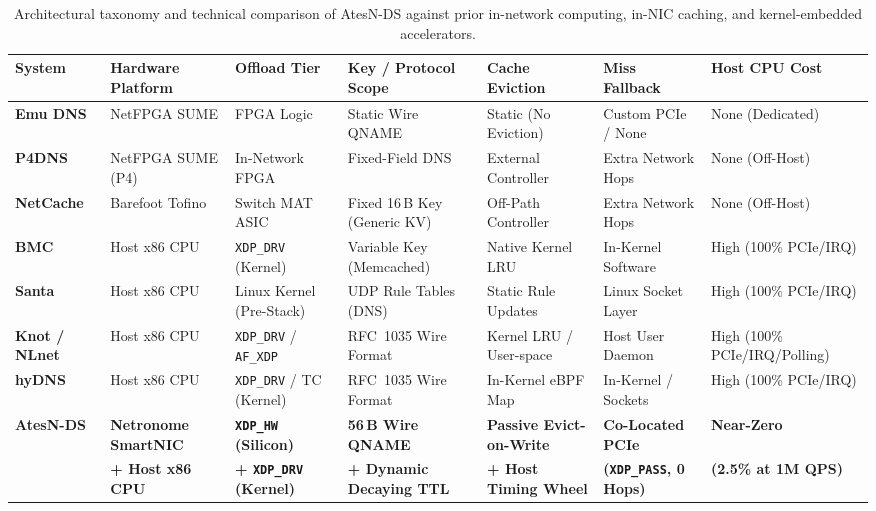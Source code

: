 \documentclass[a4paper,fleqn,colorlinks,hidelinks]{cas-sc}
\begin{document}
\begin{table}[t]
\centering
\small
\caption{Architectural taxonomy and technical comparison of AtesN-DS against prior in-network computing, in-NIC caching, and kernel-embedded accelerators.}
\label{tab:prior_work_comparison}
\begin{tabular}{@{}lllllll@{}}
\toprule
\textbf{System} & \textbf{Hardware Platform} & \textbf{Offload Tier} & \textbf{Key / Protocol Scope} & \textbf{Cache Eviction} & \textbf{Miss Fallback} & \textbf{Host CPU Cost} \\
\midrule
\textbf{Emu DNS} & NetFPGA SUME & FPGA Logic & Static Wire QNAME & Static (No Eviction) & Custom PCIe / None & None (Dedicated) \\
\textbf{P4DNS} & NetFPGA SUME (P4) & In-Network FPGA & Fixed-Field DNS & External Controller & Extra Network Hops & None (Off-Host) \\
\textbf{NetCache} & Barefoot Tofino & Switch MAT ASIC & Fixed 16\,B Key (Generic KV) & Off-Path Controller & Extra Network Hops & None (Off-Host) \\
\textbf{BMC} & Host x86 CPU & \texttt{XDP\_DRV} (Kernel) & Variable Key (Memcached) & Native Kernel LRU & In-Kernel Software & High (100\% PCIe/IRQ) \\
\textbf{Santa} & Host x86 CPU & Linux Kernel (Pre-Stack) & UDP Rule Tables (DNS) & Static Rule Updates & Linux Socket Layer & High (100\% PCIe/IRQ) \\
\textbf{Knot / NLnet} & Host x86 CPU & \texttt{XDP\_DRV} / \texttt{AF\_XDP} & RFC~1035 Wire Format & Kernel LRU / User-space & Host User Daemon & High (100\% PCIe/IRQ/Polling) \\
\textbf{hyDNS} & Host x86 CPU & \texttt{XDP\_DRV} / TC (Kernel) & RFC~1035 Wire Format & In-Kernel eBPF Map & In-Kernel / Sockets & High (100\% PCIe/IRQ) \\
\midrule
\textbf{AtesN-DS} & \textbf{Netronome SmartNIC} & \textbf{\texttt{XDP\_HW} (Silicon)} & \textbf{56\,B Wire QNAME} & \textbf{Passive Evict-on-Write} & \textbf{Co-Located PCIe} & \textbf{Near-Zero} \\
& \textbf{+ Host x86 CPU} & \textbf{+ \texttt{XDP\_DRV} (Kernel)} & \textbf{+ Dynamic Decaying TTL} & \textbf{+ Host Timing Wheel} & \textbf{(\texttt{XDP\_PASS}, 0 Hops)} & \textbf{(2.5\% at 1M QPS)} \\
\bottomrule
\end{tabular}
\end{table}
\end{document}
